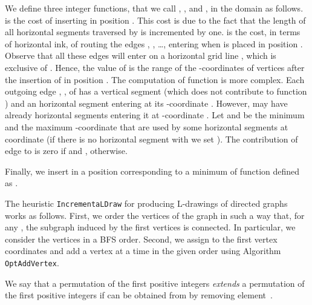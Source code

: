 \documentclass{llncs}
\begin{document}
We define three integer functions, that we call , , and , in the domain  as follows.  is the cost of inserting  in position . This cost is due to the fact that the length of all horizontal segments traversed by  is incremented by one.  is the cost, in terms of horizontal ink, of routing the edges , , \dots,  entering  when  is placed in position . Observe that all these edges will enter  on a horizontal grid line , which is exclusive of . Hence, the value of  is the range of the -coordinates of vertices  after the insertion of  in position . 
The computation of function  is more complex. Each outgoing edge , , of  has a vertical segment (which does not contribute to function ) and an horizontal segment entering  at its -coordinate . However,  may have already horizontal segments entering it at -coordinate . Let  and  be the minimum and the maximum -coordinate that are used by some horizontal segments at coordinate  (if there is no horizontal segment with  we set ). The contribution of edge  to  is zero if  and , otherwise.   

Finally, we insert  in a position corresponding to a minimum of function  defined as .


The heuristic \texttt{IncrementaLDraw} for producing L-drawings of directed graphs works as follows. First, we order the vertices of the graph in such a way that, for any , the subgraph induced by the first  vertices is connected. In particular, we consider the vertices in a BFS order. Second, we assign to the first vertex coordinates  and add a vertex at a time in the given order using Algorithm \texttt{OptAddVertex}.

We say that a permutation  of the first  positive integers \emph{extends} a permutation  of the first  positive integers if  can be obtained from  by removing element~. 
\end{document}
